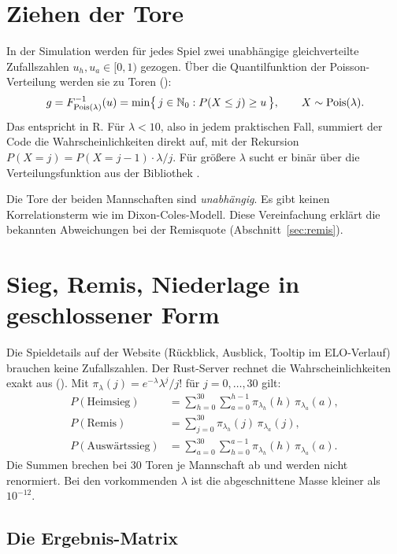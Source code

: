 \section{Ziehen der Tore}

In der Simulation werden für jedes Spiel zwei unabhängige gleichverteilte
Zufallszahlen $u_h, u_a \in [0, 1)$ gezogen. Über die Quantilfunktion der
Poisson-Verteilung werden sie zu Toren
():
\begin{equation}
  g = F^{-1}_{\operatorname{Pois}(\lambda)}(u) = \min\bigl\{\,j \in \mathbb{N}_0 :
      P(X \le j) \ge u \,\bigr\}, \qquad X \sim \operatorname{Pois}(\lambda).
\end{equation}
Das entspricht  in R. Für $\lambda < 10$, also in jedem
praktischen Fall, summiert der Code die Wahrscheinlichkeiten direkt auf, mit
der Rekursion $P(X = j) = P(X = j-1)\cdot\lambda/j$. Für größere $\lambda$
sucht er binär über die Verteilungsfunktion aus der Bibliothek .

Die Tore der beiden Mannschaften sind \emph{unabhängig}. Es gibt keinen
Korrelationsterm wie im Dixon-Coles-Modell. Diese Vereinfachung erklärt die
bekannten Abweichungen bei der Remisquote (Abschnitt~\ref{sec:remis}).

\section{Sieg, Remis, Niederlage in geschlossener Form}

Die Spieldetails auf der Website (Rückblick, Ausblick, Tooltip im
ELO-Verlauf) brauchen keine Zufallszahlen. Der Rust-Server rechnet die
Wahrscheinlichkeiten exakt aus
(). Mit
$\pi_\lambda(j) = e^{-\lambda}\lambda^j/j!$ für $j = 0, \dots, 30$ gilt:
\begin{align}
  P(\text{Heimsieg})     &= \sum_{h=0}^{30}\sum_{a=0}^{h-1} \pi_{\lambda_h}(h)\,\pi_{\lambda_a}(a), \\
  P(\text{Remis})        &= \sum_{j=0}^{30} \pi_{\lambda_h}(j)\,\pi_{\lambda_a}(j), \\
  P(\text{Auswärtssieg}) &= \sum_{a=0}^{30}\sum_{h=0}^{a-1} \pi_{\lambda_h}(h)\,\pi_{\lambda_a}(a).
\end{align}
Die Summen brechen bei 30 Toren je Mannschaft ab und werden nicht
renormiert. Bei den vorkommenden $\lambda$ ist die abgeschnittene Masse
kleiner als $10^{-12}$.

\subsection*{Die Ergebnis-Matrix}

